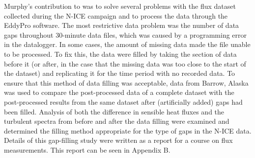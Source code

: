 Murphy's contribution to \cite{walden:2017} was to solve several problems with the flux dataset collected during the N-ICE campaign and to process the data through the EddyPro software. The most restrictive data problem was the number of data gaps throughout 30-minute data files, which was caused by a programming error in the datalogger. In some cases, the amount of missing data made the file unable to be processed. To fix this, the data were filled by taking the section of data before it (or after, in the case that the missing data was too close to the start of the dataset) and replicating it for the time period with no recorded data. To ensure that this method of data filling was acceptable, data from Barrow, Alaska was used to compare the post-processed data of a complete dataset with the post-processed results from the same dataset after (artificially added) gaps had been filled. Analysis of both the difference in sensible heat fluxes and the turbulent spectra from before and after the data filling were examined and determined the filling method appropriate for the type of gaps in the N-ICE data. Details of this gap-filling study were written as a report for a course on flux measurements. This report can be seen in Appendix B. 